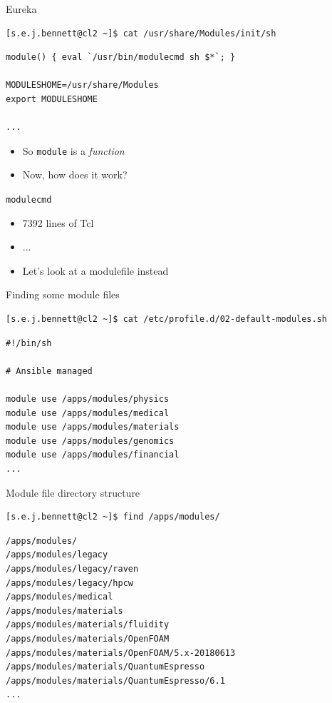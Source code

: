 \documentclass[handout]{beamer}
\newcommand\module[1][]{\texttt{module\ifthenelse{\equal{#1}{}}{}{ #1}}\xspace}
\begin{document}
\begin{frame}[fragile]{Eureka}
	
	\begin{verbatim}
[s.e.j.bennett@cl2 ~]$ cat /usr/share/Modules/init/sh\end{verbatim}\pause\begin{verbatim}
module() { eval `/usr/bin/modulecmd sh $*`; }

MODULESHOME=/usr/share/Modules
export MODULESHOME

...
\end{verbatim}

	\begin{itemize}[<+->]
		\item So \module is a \emph{function}
		\item Now, how does it work?
	\end{itemize}
\end{frame}


\begin{frame}{\texttt{modulecmd}}
	\begin{itemize}[<+->]
		\item 7392 lines of Tcl \uncover<4->{(https://git.io/fNEgB)}
		\item ...
		\item Let's look at a modulefile instead
	\end{itemize}
\end{frame}

\begin{frame}[fragile]{Finding some module files}
	
	\begin{verbatim}[s.e.j.bennett@cl2 ~]$ cat /etc/profile.d/02-default-modules.sh\end{verbatim}\pause\begin{verbatim}
#!/bin/sh

# Ansible managed

module use /apps/modules/physics
module use /apps/modules/medical
module use /apps/modules/materials
module use /apps/modules/genomics
module use /apps/modules/financial
...\end{verbatim}

\end{frame}


\begin{frame}[fragile]{Module file directory structure}
	
	\begin{verbatim}
[s.e.j.bennett@cl2 ~]$ find /apps/modules/\end{verbatim}\pause\begin{verbatim}
/apps/modules/
/apps/modules/legacy
/apps/modules/legacy/raven
/apps/modules/legacy/hpcw
/apps/modules/medical
/apps/modules/materials
/apps/modules/materials/fluidity
/apps/modules/materials/OpenFOAM
/apps/modules/materials/OpenFOAM/5.x-20180613
/apps/modules/materials/QuantumEspresso
/apps/modules/materials/QuantumEspresso/6.1
...
\end{verbatim}

\end{frame}
\end{document}
